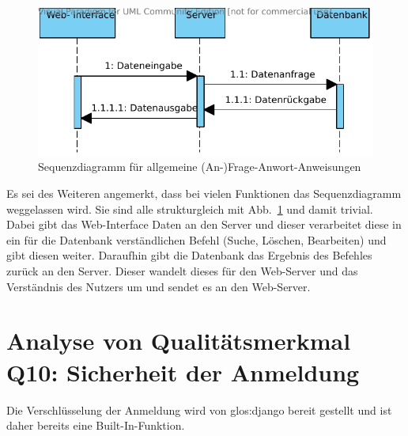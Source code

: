 \begin{figure}
    \begin{center}
        \includegraphics[width=0.8\linewidth]{bilder/frage_antwort.pdf}
        \caption{Sequenzdiagramm für allgemeine (An-)Frage-Anwort-Anweisungen}
        \label{fig:F-A}
    \end{center}
\end{figure}
Es sei des Weiteren angemerkt, dass bei vielen Funktionen das Sequenzdiagramm 
weggelassen wird. Sie sind alle strukturgleich mit Abb.\ \ref{fig:F-A} und damit
trivial. Dabei gibt das Web-Interface Daten an den Server und dieser verarbeitet 
diese in ein für die Datenbank verständlichen Befehl (Suche, Löschen, 
Bearbeiten) und gibt diesen weiter. Daraufhin gibt die Datenbank das Ergebnis 
des Befehles zurück an den Server. Dieser wandelt dieses für den Web-Server und 
das Verständnis des Nutzers um und sendet es an den Web-Server.


\section{Analyse von Qualitätsmerkmal Q10: Sicherheit der Anmeldung}
Die Verschlüsselung der Anmeldung wird von \gls{glos:django} bereit gestellt und ist daher
bereits eine Built-In-Funktion. 
